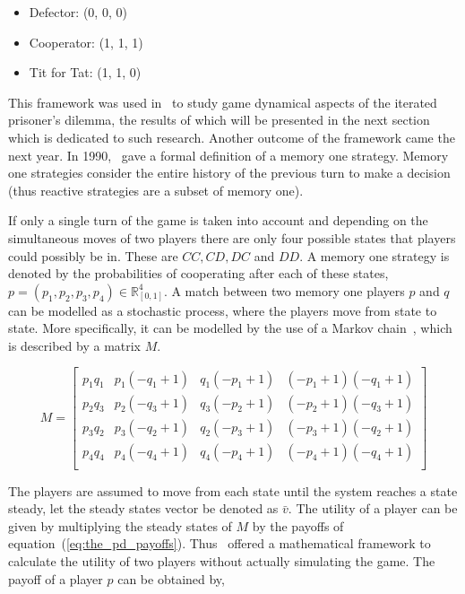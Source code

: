 \documentclass{article}
\theoremstyle{definition}
\begin{document}
\begin{itemize}
    \item Defector: (0, 0, 0)
    \item Cooperator: (1, 1, 1)
    \item Tit for Tat: (1, 1, 0)
\end{itemize}

This framework was used in~\cite{nowak1989} to study game dynamical aspects of the
iterated prisoner's dilemma, the results of which will be presented in the next section
which is dedicated to such research. Another outcome of the framework came
the next year. In 1990,~\cite{Nowak1990} gave a formal definition of a memory one strategy.
Memory one strategies consider the entire history of the previous turn to make a
decision (thus reactive strategies are a subset of memory one).

If only a single turn of the game is taken into account and depending on the
simultaneous moves of two players there are only four possible states that
players could possibly be in. These are \(CC, CD, DC\) and \(DD\). A memory one
strategy is denoted by the probabilities of cooperating after each of these states,
\( p = (p_1, p_2, p_3, p_4) \in\mathbb{R}_{[0,1]}^{4} \).
A match between two memory one players \(p\) and \(q\) can be modelled as a
stochastic process, where the players move from state to state. More specifically,
it can be modelled by the use of a Markov chain~\cite{gamerman2006markov},
which is described by a matrix \(M\).

\begin{equation}\label{eq:markov_matrix}
    M =
\begin{bmatrix}
    p_{1} q_{1} & p_{1} (- q_{1} + 1) & q_{1} (- p_{1} + 1) & (- p_{1} + 1) (- q_{1} + 1)
    \\
    p_{2} q_{3} & p_{2} (- q_{3} + 1) & q_{3} (- p_{2} + 1) & (- p_{2} + 1) (- q_{3} + 1)
    \\
    p_{3} q_{2} & p_{3} (- q_{2} + 1) & q_{2} (- p_{3} + 1) & (- p_{3} + 1) (- q_{2} + 1)
    \\
    p_{4} q_{4} & p_{4} (- q_{4} + 1) & q_{4} (- p_{4} + 1) & (- p_{4} + 1) (- q_{4} + 1)
    \\
\end{bmatrix}
\end{equation}

The players are assumed to move from each state until the system reaches a state
steady, let the steady states vector be denoted as \(\bar{v}\).
The utility of a player can be given by multiplying the steady states of
\(M\) by the payoffs of equation~(\ref{eq:the_pd_payoffs}). Thus~\cite{Nowak1990}
offered a mathematical framework to calculate the utility of two players without
actually simulating the game. The payoff of a player \(p\) can be obtained by,
\end{document}
